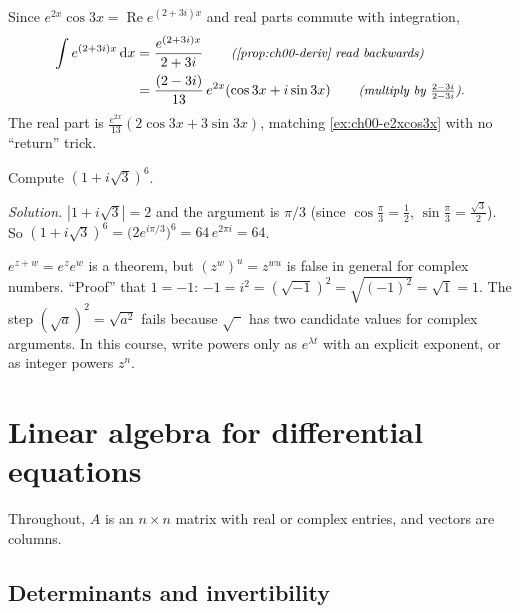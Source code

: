 \begin{example}\label{ex:ch00-complex-integral}
Since $e^{2x}\cos 3x = \operatorname{Re} e^{(2+3i)x}$ and real parts commute
with integration,
\begin{align*}
  \int e^{(2+3i)x}\,\mathrm{d}x
  &= \frac{e^{(2+3i)x}}{2+3i} \why{\cref{prop:ch00-deriv} read backwards}\\
  &= \frac{(2-3i)}{13}\,e^{2x}(\cos 3x + i\sin 3x)
     \why{multiply by $\tfrac{2-3i}{2-3i}$}.
\end{align*}
The real part is $\frac{e^{2x}}{13}(2\cos 3x + 3\sin 3x)$, matching
\cref{ex:ch00-e2xcos3x} with no ``return'' trick.
\end{example}

\begin{example}\label{ex:ch00-polar}
Compute $(1 + i\sqrt3)^6$.

\emph{Solution.} $|1+i\sqrt3| = 2$ and the argument is $\pi/3$ (since
$\cos\frac\pi3 = \frac12$, $\sin\frac\pi3 = \frac{\sqrt3}{2}$). So
$(1+i\sqrt3)^6 = \bigl(2e^{i\pi/3}\bigr)^6 = 64\,e^{2\pi i} = 64$.
\end{example}

\begin{pitfall}\label{pit:ch00-complex-powers}
$e^{z+w} = e^ze^w$ is a theorem, but $(z^w)^u = z^{wu}$ is false in general for
complex numbers. ``Proof'' that $1 = -1$:
$-1 = i^2 = (\sqrt{-1})^2 = \sqrt{(-1)^2} = \sqrt{1} = 1$. The step
$(\sqrt{a})^2 = \sqrt{a^2}$ fails because $\sqrt{\phantom{a}}$ has two
candidate values for complex arguments. In this course, write powers only as
$e^{\lambda t}$ with an explicit exponent, or as integer powers $z^n$.
\end{pitfall}

\section{Linear algebra for differential equations}\label{sec:ch00-linalg}

Throughout, $A$ is an $n\times n$ matrix with real or complex entries, and
vectors are columns.

\subsection{Determinants and invertibility}

